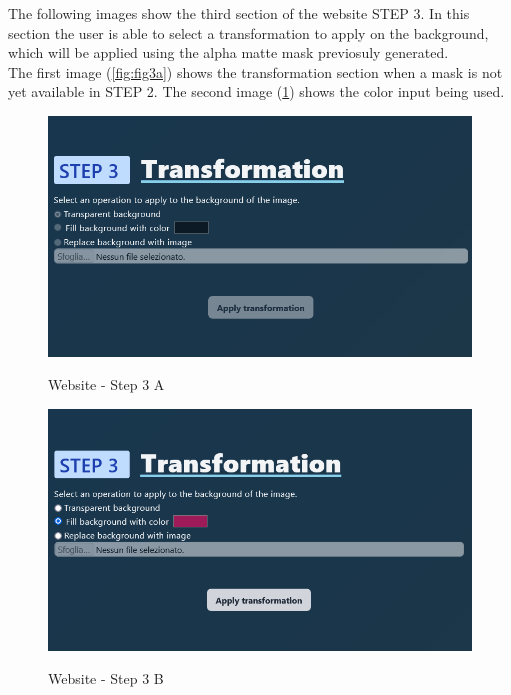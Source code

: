 \documentclass[a4paper]{article}
\begin{document}
\pagebreak

The following images show the third section
of the website \textsc{STEP 3}.
In this section the user is able to select
a transformation to apply on the background,
which will be applied using the alpha matte mask
previosuly generated. \\
The first image (\ref{fig:fig3a}) shows the transformation
section when a mask is not yet available
in \textsc{STEP 2}. The second image (\ref{fig:fig3b})
shows the color input being used.

\begin{figure}[h]
    \centering
    \begin{minipage}[b]{0.49\textwidth}
        \includegraphics[width=\textwidth]{website/step3A.png}
        \label{fig:fig3a}
        \caption{Website - Step 3 A}
    \end{minipage}
    \hfill
    \begin{minipage}[b]{0.49\textwidth}
        \includegraphics[width=\textwidth]{website/step3B.png}
        \label{fig:fig3b}
        \caption{Website - Step 3 B}
    \end{minipage}
\end{figure}
\end{document}
